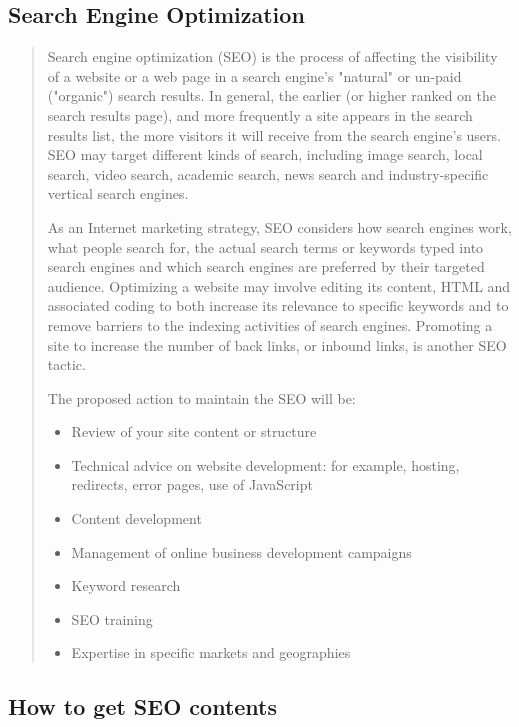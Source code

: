 \documentclass[35pt]{report}
\begin{document}
			\subsection{Search Engine Optimization}
		\begin{quote}
		Search engine optimization (SEO) is the process of affecting the visibility of a website or a web page in a search engine's "natural" or un-paid ("organic") search results. In general, the earlier (or higher ranked on the search results page), and more frequently a site appears in the search results list, the more visitors it will receive from the search engine's users. SEO may target different kinds of search, including image search, local search, video search, academic search, news search and industry-specific vertical search engines.

As an Internet marketing strategy, SEO considers how search engines work, what people search for, the actual search terms or keywords typed into search engines and which search engines are preferred by their targeted audience. Optimizing a website may involve editing its content, HTML and associated coding to both increase its relevance to specific keywords and to remove barriers to the indexing activities of search engines. Promoting a site to increase the number of back links, or inbound links, is another SEO tactic.

The proposed action to maintain the SEO will be:

	\begin{itemize}
		\item Review of your site content or structure
		\item Technical advice on website development: for example, hosting, redirects, error pages, use of JavaScript
		\item Content development
		\item Management of online business development campaigns
		\item Keyword research
		\item SEO training
		\item Expertise in specific markets and geographies
	\end{itemize}
\end{quote}
		\subsection{How to get SEO contents}
\end{document}
